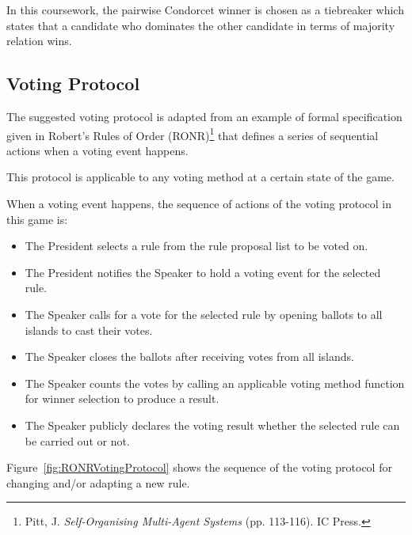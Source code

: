 In this coursework, the pairwise Condorcet winner is chosen as a tiebreaker which states that a candidate who dominates the other candidate in terms of majority relation wins.

\subsection{Voting Protocol}
\label{subsec:VotingProtocol}
The suggested voting protocol is adapted from an example of formal specification given in Robert's Rules of Order (RONR)\footnote{Pitt, J. \textit{Self-Organising Multi-Agent Systems} (pp. 113-116). IC Press.} that defines a series of sequential actions when a voting event happens.

This protocol is applicable to any voting method at a certain state of the game.

When a voting event happens, the sequence of actions of the voting protocol in this game is:
\begin{itemize}
    \item The President selects a rule from the rule proposal list to be voted on.
    \item The President notifies the Speaker to hold a voting event for the selected rule.
    \item The Speaker calls for a vote for the selected rule by opening ballots to all islands to cast their votes.
    \item The Speaker closes the ballots after receiving votes from all islands.
    \item The Speaker counts the votes by calling an applicable voting method function for winner selection to produce a result.
    \item The Speaker publicly declares the voting result whether the selected rule can be carried out or not.
\end{itemize}

Figure~\ref{fig:RONRVotingProtocol} shows the sequence of the voting protocol for changing and/or adapting a new rule.

